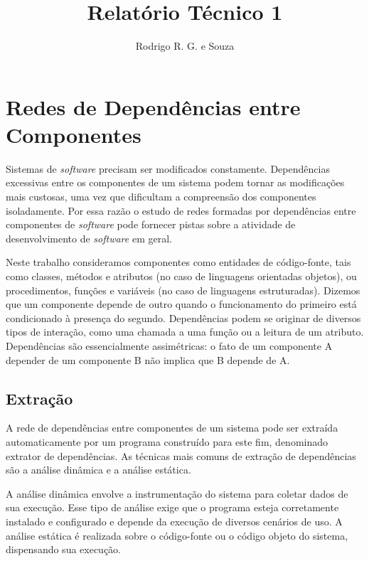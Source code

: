 \documentclass{article}
\begin{document}
\title{Relatório Técnico 1}
\author{Rodrigo R. G. e Souza}
\maketitle

\section{Redes de Dependências entre Componentes}

Sistemas de \textit{software} precisam ser modificados constamente. Dependências excessivas entre os componentes de um sistema podem tornar as modificações mais custosas, uma vez que dificultam a compreensão dos componentes isoladamente. Por essa razão o estudo de redes formadas por dependências entre componentes de \textit{software} pode fornecer pistas sobre a atividade de desenvolvimento de \textit{software} em geral.

Neste trabalho consideramos componentes como entidades de código-fonte, tais como classes, métodos e atributos (no caso de linguagens orientadas objetos), ou procedimentos, funções e variáveis (no caso de linguagens estruturadas). Dizemos que um componente depende de outro quando o funcionamento do primeiro está condicionado à presença do segundo. Dependências podem se originar de diversos tipos de interação, como uma chamada a uma função ou a leitura de um atributo. Dependências são essencialmente assimétricas: o fato de um componente A depender de um componente B não implica que B depende de A.


\subsection{Extração}

A rede de dependências entre componentes de um sistema pode ser extraída automaticamente por um programa construído para este fim, denominado extrator de dependências. As técnicas mais comuns de extração de dependências são a análise dinâmica e a análise estática. 

A análise dinâmica envolve a instrumentação do sistema para coletar dados de sua execução. Esse tipo de análise exige que o programa esteja corretamente instalado e configurado e depende da execução de diversos cenários de uso. A análise estática é realizada sobre o código-fonte ou o código objeto do sistema, dispensando sua execução.
\end{document}
